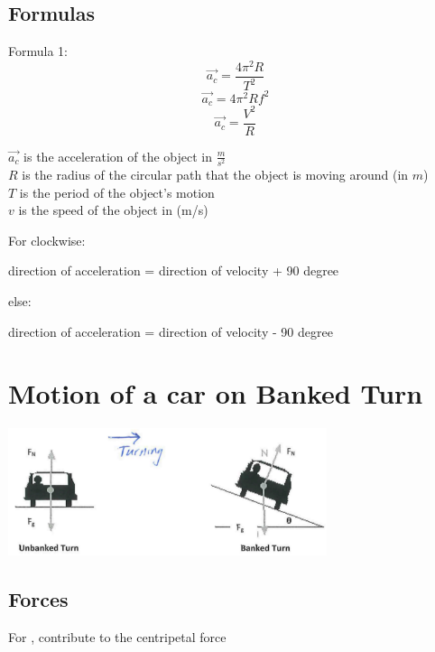 \subsection{Formulas}
\begin{cyanblock}
    Formula 1:
    \[
        \vec{a_{c}} = \frac{4 \pi ^2 R}{T^2}
    \]
    \[
        \vec{a_{c}} = 4\pi ^2 R f^2
    \]
    \[
        \vec{a_{c}} = \frac{V^2}{R}
    \]
    \begin{center}
        $\vec{a_{c}}$ is the acceleration of the object in $\frac{m}{s^2}$\\
        $R$ is the radius of the circular path that the object is moving around (in $m$)\\
        $T$ is the period of the object's motion \\
        $v$ is the speed of the object in (m/s)
    \end{center}
\end{cyanblock}

\begin{cyanblock}
    For clockwise:
    \begin{center}
        direction of acceleration = direction of velocity + 90 degree
    \end{center}
    else:
    \begin{center}
         direction of acceleration = direction of velocity - 90 degree
    \end{center}
\end{cyanblock}

\section{Motion of a car on Banked Turn}
\begin{center}
    \includegraphics[width=0.7\textwidth]{graph/BankedTurn.png}
\end{center}
\subsection{Forces}
For ,  contribute to the centripetal force


